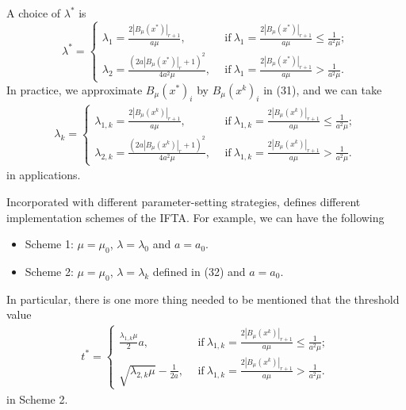 \documentclass[smallextended]{svjour3}
\begin{document}
A choice of $\lambda^{\ast}$ is
$$\lambda^{\ast}=\left\{
            \begin{array}{ll}
              \lambda_{1}=\frac{2|B_{\mu}(x^{\ast})|_{r+1}}{a\mu}, & \ \ {\mathrm{if}\ \lambda_{1}=\frac{2|B_{\mu}(x^{\ast})|_{r+1}}{a\mu}\leq\frac{1}{a^{2}\mu};} \\
              \lambda_{2}=\frac{(2a|B_{\mu}(x^{\ast})|_{r}+1)^{2}}{4a^{2}\mu}, &\ \ {\mathrm{if}\ \lambda_{1}=\frac{2|B_{\mu}(x^{\ast})|_{r+1}}{a\mu}>\frac{1}{a^{2}\mu}.}
            \end{array}
          \right.
$$
In practice, we approximate $B_{\mu}(x^{\ast})_{i}$ by $B_{\mu}(x^{k})_{i}$ in (31), and we can take
\begin{equation}\label{r39}
\begin{array}{llll}
\lambda_{k}=\left\{
            \begin{array}{ll}
              \lambda_{1,k}=\frac{2|B_{\mu}(x^{k})|_{r+1}}{a\mu},  & \ \ {\mathrm{if}\ \lambda_{1,k}=\frac{2|B_{\mu}(x^{k})|_{r+1}}{a\mu}\leq\frac{1}{a^{2}\mu};} \\
              \lambda_{2,k}=\frac{(2a|B_{\mu}(x^{k})|_{r}+1)^{2}}{4a^{2}\mu},  & \ \ {\mathrm{if}\ \lambda_{1,k}=\frac{2|B_{\mu}(x^{k})|_{r+1}}{a\mu}>\frac{1}{a^{2}\mu}.}
            \end{array}
          \right.
\end{array}
\end{equation}
in applications.

Incorporated with different parameter-setting strategies, defines different implementation schemes of the IFTA. For example,
we can have the following
\begin{itemize}
  \item Scheme 1: $\mu=\mu_{0}$, $\lambda=\lambda_{0}$ and $a=a_{0}$.
  \item Scheme 2: $\mu=\mu_{0}$, $\lambda=\lambda_{k}$ defined in (32) and $a=a_{0}$.
\end{itemize}

In particular, there is one more thing needed to be mentioned that the threshold value
\begin{equation}\label{r39}
\begin{array}{llll}
t^{\ast}=\left\{
            \begin{array}{ll}
              \frac{\lambda_{1,k}\mu}{2}a,  & \ \ {\mathrm{if}\ \lambda_{1,k}=\frac{2|B_{\mu}(x^{k})|_{r+1}}{a\mu}\leq\frac{1}{a^{2}\mu};} \\
              \sqrt{\lambda_{2,k}\mu}-\frac{1}{2a},  & \ \ {\mathrm{if}\ \lambda_{1,k}=\frac{2|B_{\mu}(x^{k})|_{r+1}}{a\mu}>\frac{1}{a^{2}\mu}.}
            \end{array}
          \right.
\end{array}
\end{equation}
in Scheme 2.
\end{document}
